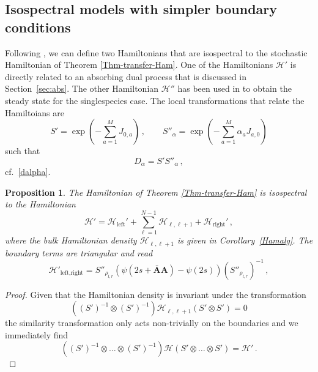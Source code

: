 \documentclass[11pt]{article}
\numberwithin{equation}{section}
\newtheorem{proposition}[theorem]{Proposition}
\newcommand{\OF}{\mathbf{A}}
\newcommand{\OFD}{\mathbf{\bar{A}}}
\newcommand{\M}{M}
\newcommand{\N}{N}
\newcommand{\eH}{\mathcal{H}}
\begin{document}
\subsection{Isospectral models with simpler boundary conditions}
Following \cite{exact-harmonic}, we can define two Hamiltonians that are isospectral to the stochastic Hamiltonian of Theorem \eqref{Thm-transfer-Ham}. One of the Hamiltonians $\mathcal{H}'$ is directly related to an absorbing dual process that is discussed in Section~\ref{sec:abs}. The other Hamiltonian $\mathcal{H}''$ has been used in \cite{exact-harmonic} to obtain the steady state for the singlespecies case. The local transformations that relate the Hamiltoians are
\begin{equation}\label{similarities}
    S'=\exp{\left(-\sum_{a=1}^{\M}J_{0,a}\right)}\,,\qquad S''_{\alpha}=\exp{\left(-\sum_{a=1}^{\M}\alpha_{a}J_{a,0}\right)}
\end{equation}
such that
\begin{equation}
  D_\alpha=S'S''_\alpha\,,
 \end{equation}
 cf.~\eqref{dalpha}.
\begin{proposition}\label{Proposition-Hp}
The Hamiltonian of Theorem \eqref{Thm-transfer-Ham} is isospectral to the Hamiltonian
\begin{equation}\label{prop-Ham}
  \eH' = \mathcal{H}_\text{left}' + \sum_{\ell=1}^{\N-1}\mathcal{H}_{\ell,\ell+1} + \mathcal{H}_\text{right}'\,,
\end{equation}
where the bulk Hamiltonian density $\mathcal{H}_{\ell,\ell+1}$ is given in Corollary~\ref{Hamalg}. The boundary terms are triangular and read
\begin{equation}\label{right-left-BD-hamiltonian-I}
 \mathcal{H}'_{\text{left},\text{right}} = S''_{\rho_{l,r}}\left(\psi(2s+\OFD\OF)-\psi(2s)\right)(S''_{\rho_{l,r}})^{-1}\,,
\end{equation}
\end{proposition}
\begin{proof}
    Given that the Hamiltonian density is invariant under the transformation 
    \begin{equation}
      (  (S')^{-1}\otimes (S')^{-1})\mathcal{H}_{\ell,\ell+1}(S'\otimes S')=0
    \end{equation}
    the similarity transformation only acts non-trivially on the boundaries and we immediately find 
    \begin{equation}
      (  (S')^{-1}\otimes\ldots\otimes (S')^{-1})\mathcal{H}(S'\otimes\ldots\otimes S')=\mathcal{H}'\,.
    \end{equation}

    
\end{proof}
\end{document}
